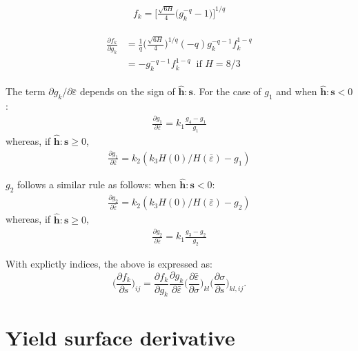 \documentclass[12pt]{amsart}
\begin{document}
\begin{eqnarray}
  \label{eq:fk1}
  f_k = \bigg[ \frac{\sqrt{6H}}{4}   \Big(  g_k^{-q} - 1  \Big)  \bigg] ^{1/q}
\end{eqnarray}


\begin{eqnarray}
  \label{eq:fk2}
  \begin{split}
  \frac{\partial f_k}{\partial{g_k}} &= \frac{1}{q}   \bigg(\frac{\sqrt{6H}}{4} \bigg)^{1/q}  (-q) g_k^{-q-1}    f_k^{1-q}\\
  &=-g_k^{-q-1} f_k^{1-q}  \ \text{  if } H=8/3
  \end{split}
\end{eqnarray}

The term $  \partial{g_k}/\partial{\bar{\varepsilon}} $ depends on the sign of $\hat{\mathbf{h}}:\mathbf{s}$.
For the case of $g_1$ and when  $\hat{\mathbf{h}}:\mathbf{s}<0$:
\begin{eqnarray}
  \label{eq:dbau2}
\frac{\partial{g_1}}{\partial{\bar{\varepsilon}}}=k_1 \frac{g_4-g_1}{g_1}
\end{eqnarray}
whereas, if $\hat{\mathbf{h}}:\mathbf{s}\ge0$,
\begin{eqnarray}
  \label{eq:dbau3}
\frac{\partial{g_1}}{\partial{\bar{\varepsilon}}}=k_2 (k_3 H(0)/H(\bar{\varepsilon})-g_1)
\end{eqnarray}


$g_2$ follows a similar rule as follows:
when  $\hat{\mathbf{h}}:\mathbf{s}<0$:
\begin{eqnarray}
  \label{eq:dbau4}
  \frac{\partial{g_2}}{\partial{\bar{\varepsilon}}}=k_2 (k_3 H(0)/H(\bar{\varepsilon})-g_2)
\end{eqnarray}
whereas, if $\hat{\mathbf{h}}:\mathbf{s}\ge0$,
\begin{eqnarray}
  \label{eq:dbau5}
  \frac{\partial{g_2}}{\partial{\bar{\varepsilon}}}=k_1 \frac{g_3-g_2}{g_2}
\end{eqnarray}

With explictly indices, the above is expressed as:
\begin{equation}
  \label{eq:dphib8}
  \bigg(\frac{\partial f_k}{\partial s}\bigg)_{ij} = \frac{\partial f_k}{\partial g_k} \frac{\partial g_k}{\partial \bar{\varepsilon}}  \bigg(\frac{\partial\bar{\varepsilon}}{\partial\sigma}\bigg)_{kl} \bigg(\frac{\partial\sigma}{\partial s}\bigg)_{kl,ij}.
\end{equation}


\newpage
\section{Yield surface derivative}
\end{document}
